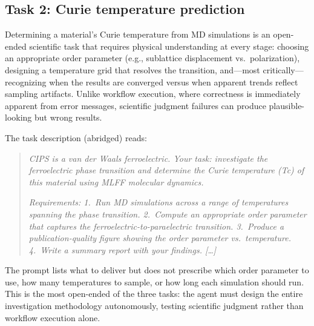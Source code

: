\documentclass{article}
\begin{document}
\subsection{Task 2: Curie temperature prediction}
\label{sec:demo2}

Determining a material's Curie temperature from MD simulations is an open-ended scientific task that requires physical understanding at every stage: choosing an appropriate order parameter (e.g., sublattice displacement vs.\ polarization), designing a temperature grid that resolves the transition, and---most critically---recognizing when the results are converged versus when apparent trends reflect sampling artifacts.
Unlike workflow execution, where correctness is immediately apparent from error messages, scientific judgment failures can produce plausible-looking but wrong results.

The task description (abridged) reads:

\begin{quote}
\small
\textit{CIPS is a van der Waals ferroelectric. Your task: investigate the ferroelectric phase transition and determine the Curie temperature (Tc) of this material using MLFF molecular dynamics.}

\textit{Requirements: 1.~Run MD simulations across a range of temperatures spanning the phase transition. 2.~Compute an appropriate order parameter that captures the ferroelectric-to-paraelectric transition. 3.~Produce a publication-quality figure showing the order parameter vs.\ temperature. 4.~Write a summary report with your findings. [\ldots]}
\end{quote}

The prompt lists what to deliver but does not prescribe which order parameter to use, how many temperatures to sample, or how long each simulation should run.
This is the most open-ended of the three tasks: the agent must design the entire investigation methodology autonomously, testing scientific judgment rather than workflow execution alone.
\end{document}
